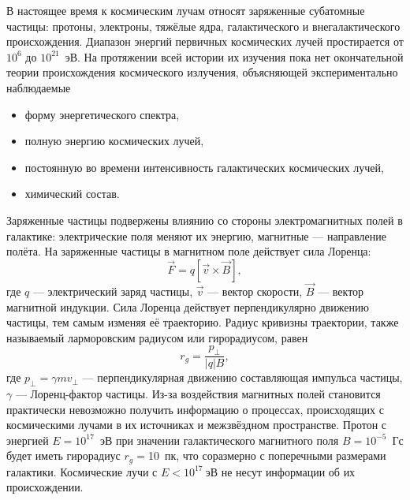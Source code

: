 \documentclass[magd,floatypics,numeref]{msudipl} %
\begin{document}
В настоящее время к космическим лучам относят заряженные субатомные частицы: протоны, электроны, тяжёлые ядра, галактического и внегалактического происхождения. Диапазон энергий первичных космических лучей простирается от $10^6$ до $10^{21}$~эВ. На протяжении всей истории их изучения пока нет окончательной теории происхождения космического излучения, объясняющей экспериментально наблюдаемые
\begin{itemize}
\item форму энергетического спектра,
\item полную энергию космических лучей,
\item постоянную во времени интенсивность галактических космических лучей,
\item химический состав.
\end{itemize}

Заряженные частицы подвержены влиянию со стороны электромагнитных полей в галактике: электрические поля меняют их энергию, магнитные --- направление полёта. На заряженные частицы в магнитном поле действует сила Лоренца:
\begin{equation}
\vec F = q\left[\vec v\times \vec B\right],
\end{equation}
где $q$ --- электрический заряд частицы, $\vec v$ --- вектор скорости, $\vec B$ --- вектор магнитной индукции. Сила Лоренца действует перпендикулярно движению частицы, тем самым изменяя её траекторию. Радиус кривизны траектории, также называемый ларморовским радиусом или гирорадиусом, равен
\begin{equation}
r_g = \frac{p_{\bot}}{|q|B},
\end{equation}
где $p_{\bot}=\gamma m v_{\bot}$ --- перпендикулярная движению составляющая импульса частицы, $\gamma$ --- Лоренц-фактор частицы. Из-за воздействия магнитных полей становится практически невозможно получить информацию о процессах, происходящих с космическими лучами в их источниках и межзвёздном пространстве. Протон с энергией $E=10^{17}$~эВ при значении галактического магнитного поля $B=10^{-5}$~Гс будет иметь гирорадиус $r_g=$10~пк, что соразмерно с поперечными размерами галактики. Космические лучи с $E<10^{17}~$эВ не несут информации об их происхождении. 
\end{document}
